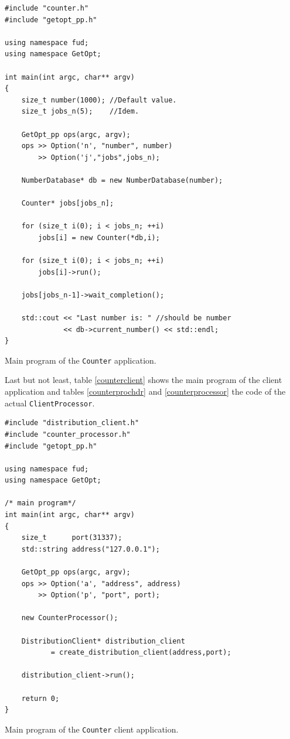 \documentclass[a4paper,12pt,english]{report}
\newcommand{\CP}{\texttt{ClientProcessor}}
\begin{document}
\begin{table}[!htb]
\lstset{language=C++}
\begin{lstlisting}[frame=single]
#include "counter.h"
#include "getopt_pp.h"

using namespace fud;
using namespace GetOpt;

int main(int argc, char** argv)
{
    size_t number(1000); //Default value.
    size_t jobs_n(5);    //Idem.

    GetOpt_pp ops(argc, argv);
    ops >> Option('n', "number", number) 
        >> Option('j',"jobs",jobs_n);

    NumberDatabase* db = new NumberDatabase(number);

    Counter* jobs[jobs_n];

    for (size_t i(0); i < jobs_n; ++i)
        jobs[i] = new Counter(*db,i);

    for (size_t i(0); i < jobs_n; ++i)
        jobs[i]->run();

    jobs[jobs_n-1]->wait_completion();

    std::cout << "Last number is: " //should be number
              << db->current_number() << std::endl;
}
\end{lstlisting}
\centering \caption{Main program of the \texttt{Counter} application.} \label{countermain}
\end{table}

Last but not least, table \ref{counterclient} shows the main program of the client application and tables \ref{counterprochdr} and \ref{counterprocessor} the code of the actual \CP.

\begin{table}[!htb]
\lstset{language=C++}
\begin{lstlisting}[frame=single]
#include "distribution_client.h"
#include "counter_processor.h"
#include "getopt_pp.h"

using namespace fud;
using namespace GetOpt;

/* main program*/
int main(int argc, char** argv)
{
    size_t      port(31337);
    std::string address("127.0.0.1");

    GetOpt_pp ops(argc, argv);
    ops >> Option('a', "address", address) 
        >> Option('p', "port", port);

    new CounterProcessor();

    DistributionClient* distribution_client 
           = create_distribution_client(address,port);

    distribution_client->run();

    return 0;
}
\end{lstlisting}
\centering \caption{Main program of the \texttt{Counter} client application.} \label{counterclient}
\end{table}
\end{document}
